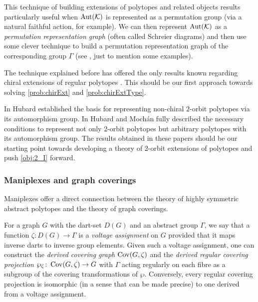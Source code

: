 \documentclass[a4paper,12pt,english]{article}
\begin{document}
This technique of building extensions of polytopes and related objects results particularly useful when $\operatorname{Aut}(\mathcal{K})$ is represented as a permutation group (via a natural faithful action, for example). 
We can then represent $\operatorname{Aut}(\mathcal{K})$ as a \emph{permutation representation graph} (often called Schreier diagrams) and then use some clever technique to build a permutation representation graph of the corresponding group $\Gamma$ (see \cite{Pellicer2010_ExtensionsDuallyBipartite,PellPotTol2019_ExistenceResultTwo,Pellicer2010_ConstructionHigherRank,PelliWeiss2010_GeneralizedCprGraphs,Pellicer2009_ExtensionsRegularPolytopes,CondHubORe2024_ConstructionChiralPolytopes,ConHubORPe2015_ConstructionChiral4,MonteToled_ChiralExtensionsRegular_preprint,MonteWeiss2021_ProperLocallySpherical}, just to mention some examples).

The technique explained before has offered the only results known regarding chiral extensions of regular polytopes \cite*{CondHubORe2024_ConstructionChiralPolytopes,MonteToled_ChiralExtensionsRegular_preprint}. 
This should be our first approach towards solving \cref{prob:chirExt} and \cref{prob:chirExtType}. 


In \cite{Hubard2010_TwoOrbitPolyhedra} Hubard established the basis for representing non-chiral $2$-orbit polytopes via its automorphism group. 
In \cite*{HubarMocha2023_AllPolytopesAre} Hubard and Mochán fully described the necessary conditions to represent not only $2$-orbit polytopes but arbitrary polytopes with its automorphism group. 
The results obtained in these papers should be our starting point towards developing a theory of $2$-orbit extensions of polytopes and push \cref{obj:2_I} forward.

\subsubsection*{Maniplexes and graph coverings}

Maniplexes offer a direct connection between the theory of highly symmetric abstract polytopes and the theory of graph coverings. 

For a graph $G$ with the dart-set $D(G)$ and an abstract group $\Gamma$, we say that a function $\zeta :  D(G) \to \Gamma$ is a \emph{voltage assignment}  on $G$ provided that it maps inverse darts to inverse group elements. 
Given such
 a voltage assignment, one can construct the \emph{derived covering graph} $\operatorname{Cov}(G,\zeta)$ and the \emph{derived regular covering projection}
 $\wp_\zeta \colon \operatorname{Cov}(G,\zeta) \to G$
 with $\Gamma$ acting regularly on each fibre as a subgroup of the covering transformations of $\wp$.
Conversely, every regular covering projection is isomorphic (in a sense that can be made precise) to one derived from a voltage assignment.
\end{document}
